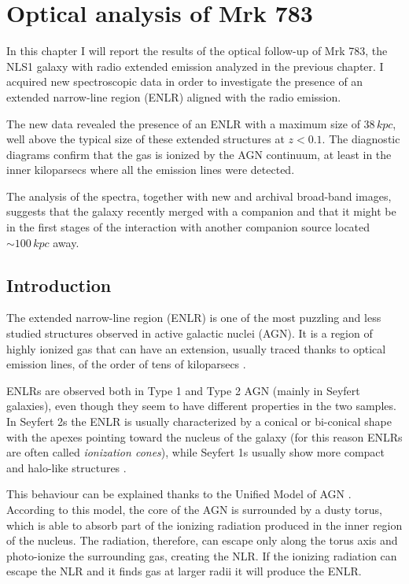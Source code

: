 \documentclass[../main.tex]{subfiles}
\begin{document}
\chapter{Optical analysis of Mrk 783}
\label{cap:paper3}

In this chapter I will report the results of the optical follow-up of Mrk 783, the NLS1 galaxy with radio extended emission analyzed in the previous chapter.
I acquired new spectroscopic data in order to investigate the presence of an extended narrow-line region (ENLR) aligned with the radio emission.

The new data revealed the presence of an ENLR with a maximum size of $38\,\si{kpc}$, well above the typical size of these extended structures at $z<0.1$.
The diagnostic diagrams confirm that the gas is ionized by the AGN continuum, at least in the inner kiloparsecs where all the emission lines were detected.

The analysis of the spectra, together with new and archival broad-band images, suggests that the galaxy recently merged with a companion and that it might be in the first stages of the interaction with another companion source located $\sim 100\,\si{kpc}$ away. 

\section{Introduction}
\label{sec:pap3_intro}

The extended narrow-line region (ENLR) is one of the most puzzling and less studied structures observed in active galactic nuclei (AGN).
It is a region of highly ionized gas that can have an extension, usually traced thanks to optical emission lines, of the order of tens of kiloparsecs \citep[e.g.][]{Stockton87,Tadhunter89,Keel12}.

ENLRs are observed both in Type 1 and Type 2 AGN (mainly in Seyfert galaxies), even though they seem to have different properties in the two samples.
In Seyfert 2s the ENLR is usually characterized by a conical or bi-conical shape with the apexes pointing toward the nucleus of the galaxy (for this reason ENLRs are often called \emph{ionization cones}), while Seyfert 1s usually show more compact and halo-like structures \citep{Schmitt03,Schmitt03b}.

This behaviour can be explained thanks to the Unified Model of AGN \citep{Antonucci93,Urry95}.
According to this model, the core of the AGN is surrounded by a dusty torus, which is able to absorb part of the ionizing radiation produced in the inner region of the nucleus.
The radiation, therefore, can escape only along the torus axis and photo-ionize the surrounding gas, creating the NLR.
If the ionizing radiation can escape the NLR and it finds gas at larger radii it will produce the ENLR.
\end{document}
